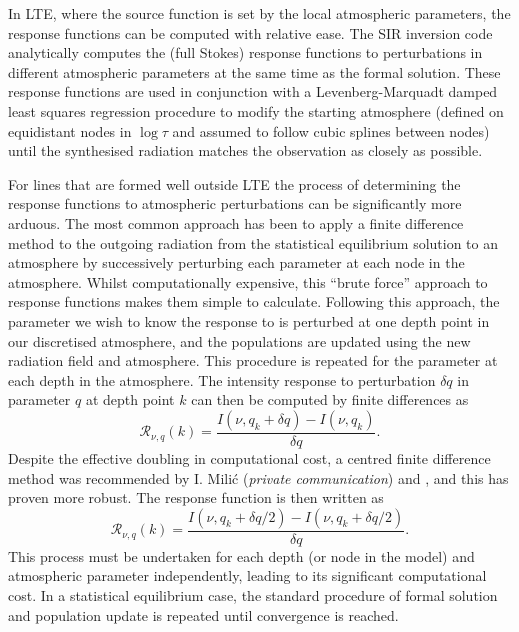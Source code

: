 In LTE, where the source function is set by the local atmospheric parameters, the response functions can be computed with relative ease.
The SIR inversion code \citep{1992RuizCobo} analytically computes the (full Stokes) response functions to perturbations in different atmospheric parameters at the same time as the formal solution.
These response functions are used in conjunction with a Levenberg-Marquadt damped least squares regression procedure to modify the starting atmosphere (defined on equidistant nodes in $\log \tau$ and assumed to follow cubic splines between nodes) until the synthesised radiation matches the observation as closely as possible.

For lines that are formed well outside LTE the process of determining the response functions to atmospheric perturbations can be significantly more arduous.
The most common approach has been to apply a finite difference method to the outgoing radiation from the statistical equilibrium solution to an atmosphere by successively perturbing each parameter at each node in the atmosphere.
Whilst computationally expensive, this ``brute force'' approach to response functions makes them simple to calculate.
Following this approach, the parameter we wish to know the response to is perturbed at one depth point in our discretised atmosphere, and the populations are updated using the new radiation field and atmosphere.
This procedure is repeated for the parameter at each depth in the atmosphere.
The intensity response to perturbation $\delta q$ in parameter $q$ at depth point $k$ can then be computed by finite differences as
\begin{equation}
    \mathcal{R}_{\nu, q}(k) = \frac{I(\nu, q_k + \delta q) - I(\nu, q_k)}{\delta q}.
\end{equation}
Despite the effective doubling in computational cost, a centred finite difference method was recommended by I. Mili\'{c} (\emph{private communication}) and \citet{DelaCruzRodriguez2017}, and this has proven more robust.
The response function is then written as
\begin{equation}
    \mathcal{R}_{\nu, q}(k) = \frac{I(\nu, q_k + \delta q / 2) - I(\nu, q_k + \delta q / 2)}{\delta q}.
\end{equation}
This process must be undertaken for each depth (or node in the model) and atmospheric parameter independently, leading to its significant computational cost.
In a statistical equilibrium case, the standard procedure of formal solution and population update is repeated until convergence is reached.

